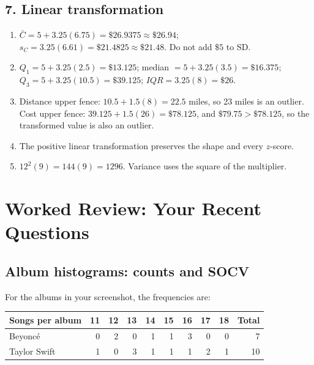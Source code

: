 \documentclass[11pt]{article}
\newcommand{\ans}[1]{\textcolor{AnswerBlue}{#1}}
\begin{document}
\Needspace{0.40\textheight}
\subsection*{7. Linear transformation}
\begin{answerbox}
\begin{enumerate}[label=\alph*.]
  \item \ans{$\bar C=5+3.25(6.75)=\$26.9375\approx\$26.94$; $s_C=3.25(6.61)=\$21.4825\approx\$21.48$. Do not add $\$5$ to SD.}
  \item \ans{$Q_1=5+3.25(2.5)=\$13.125$; median $=5+3.25(3.5)=\$16.375$; $Q_3=5+3.25(10.5)=\$39.125$; $IQR=3.25(8)=\$26$.}
  \item \ans{Distance upper fence: $10.5+1.5(8)=22.5$ miles, so 23 miles is an outlier. Cost upper fence: $39.125+1.5(26)=\$78.125$, and $\$79.75>\$78.125$, so the transformed value is also an outlier.}
  \item \ans{The positive linear transformation preserves the shape and every $z$-score.}
  \item \ans{$12^2(9)=144(9)=1296$. Variance uses the square of the multiplier.}
\end{enumerate}
\end{answerbox}

\clearpage
\section{Worked Review: Your Recent Questions}
\subsection{Album histograms: counts and SOCV}
\label{review:albums}

For the albums in your screenshot, the frequencies are:
\begin{center}
\begin{tabular}{lrrrrrrrr|r}
\toprule
Songs per album & 11 & 12 & 13 & 14 & 15 & 16 & 17 & 18 & Total\\
\midrule
Beyonc\'e & 0 & 2 & 0 & 1 & 1 & 3 & 0 & 0 & 7\\
Taylor Swift & 1 & 0 & 3 & 1 & 1 & 1 & 2 & 1 & 10\\
\bottomrule
\end{tabular}
\end{center}
\end{document}
